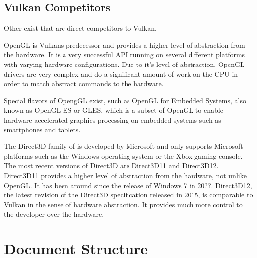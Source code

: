     \subsection{Vulkan Competitors}

      Other  exist that are direct competitors to Vulkan.

      OpenGL is Vulkans predecessor and provides a higher level of abstraction from the hardware. It is a very successful API running on several different platforms with varying hardware configurations. Due to it's level of abstraction, OpenGL drivers are very complex and do a significant amount of work on the CPU in order to match abstract commands to the hardware.

      Special flavors of OpengGL exist, such as OpenGL for Embedded Systems, also known as OpenGL ES or GLES, which is a subset of OpenGL to enable hardware-accelerated graphics processing on embedded systems such as smartphones and tablets.

      The Direct3D family of  is developed by Microsoft and only supports Microsoft platforms such as the Windows operating system or the Xbox gaming console. The most recent versions of Direct3D are Direct3D11 and Direct3D12. Direct3D11 provides a higher level of abstraction from the hardware, not unlike OpenGL. It has been around since the release of Windows 7 in 20??. Direct3D12, the latest revision of the Direct3D specification released in 2015, is comparable to Vulkan in the sense of hardware abstraction. It provides much more control to the developer over the hardware.





  \section{Document Structure}

    \lipsum
